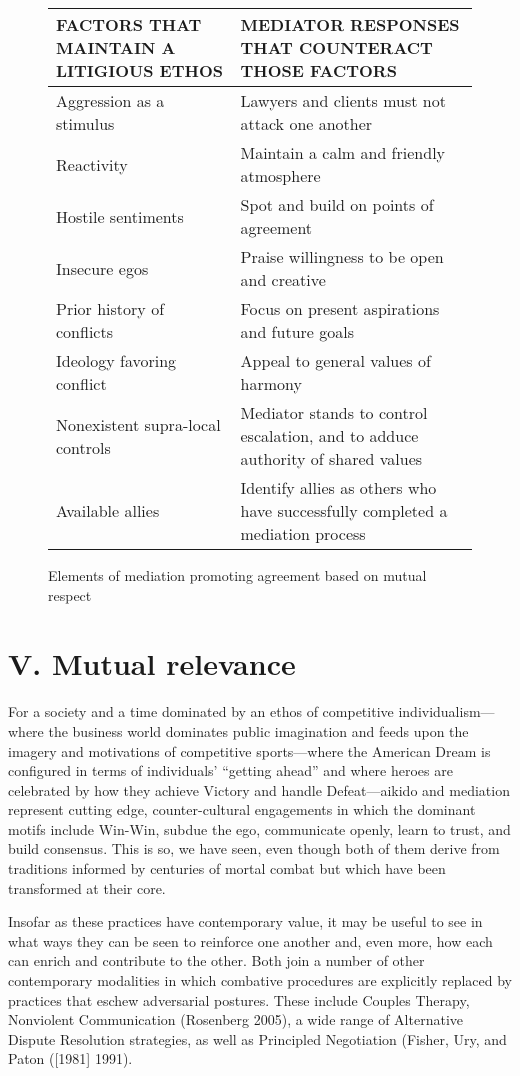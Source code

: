 \begin{figure}
\caption{Elements of mediation promoting agreement based on mutual respect}
\centering
\begin{tabular}{ | C{.5\textwidth} | C{.5\textwidth} | }
\hline
\bfseries\uppercase{Factors That Maintain a Litigious Ethos} & \bfseries\uppercase{Mediator Responses That Counteract Those Factors} \\
\hline
Aggression as a stimulus & Lawyers and clients must not attack one another \\
\hline
Reactivity & Maintain a calm and friendly atmosphere \\
\hline
Hostile sentiments & Spot and build on points of agreement \\
\hline
Insecure egos & Praise willingness to be open and creative \\
\hline
Prior history of conflicts & Focus on present aspirations and future goals \\
\hline
Ideology favoring conflict & Appeal to general values of harmony \\
\hline
Nonexistent supra-local controls & Mediator stands to control escalation, and to adduce authority of shared values \\
\hline
Available allies & Identify allies as others who have successfully completed a mediation process \\
\hline
\end{tabular}
\end{figure}

\section*{V. Mutual relevance}

For a society and a time dominated by an ethos of competitive individualism---where the business world dominates public imagination and feeds upon the imagery and motivations of competitive sports---where the American Dream is configured in terms of individuals' ``getting ahead'' and where heroes are celebrated by how they achieve Victory and handle Defeat---aikido and mediation represent cutting edge, counter-cultural engagements in which the dominant motifs include Win-Win, subdue the ego, communicate openly, learn to trust, and build consensus. This is so, we have seen, even though both of them derive from traditions informed by centuries of mortal combat but which have been transformed at their core. 

Insofar as these practices have contemporary value, it may be useful to see in what ways they can be seen to reinforce one another and, even more, how each can enrich and contribute to the other. Both join a number of other contemporary modalities in which combative procedures are explicitly replaced by practices that eschew adversarial postures. These include Couples Therapy, Nonviolent Communication (Rosenberg 2005), a wide range of Alternative Dispute Resolution strategies, as well as Principled Negotiation (Fisher, Ury, and Paton ([1981] 1991).

